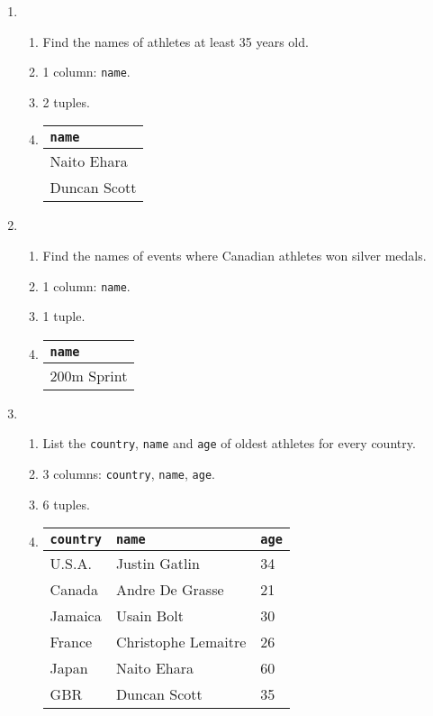 \documentclass{article}
\begin{document}
\begin{enumerate}
    \item
    \begin{enumerate}
        \item Find the names of athletes at least 35 years old.
        \item 1 column: \texttt{name}.
        \item 2 tuples.
        \item 
        \begin{tabular}{@{}l@{}}
            \toprule
            \texttt{name} \\ \midrule
            Naito Ehara   \\
            Duncan Scott  \\ \bottomrule
        \end{tabular}
    \end{enumerate}

    \item
    \begin{enumerate}
        \item Find the names of events where Canadian athletes won silver medals.
        \item 1 column: \texttt{name}.
        \item 1 tuple.
        \item
        \begin{tabular}{@{}l@{}}
            \toprule
            \texttt{name} \\ \midrule
            200m Sprint   \\ \bottomrule
        \end{tabular}
    \end{enumerate}

    \item
    \begin{enumerate}
        \item List the \texttt{country}, \texttt{name} and \texttt{age} of oldest athletes for every country.
        \item 3 columns: \texttt{country}, \texttt{name}, \texttt{age}.
        \item 6 tuples.
        \item
        \begin{tabular}{@{}lll@{}}
            \toprule
            \texttt{country} & \texttt{name}       & \texttt{age} \\ \midrule
            U.S.A.           & Justin Gatlin       & 34           \\
            Canada           & Andre De Grasse     & 21           \\
            Jamaica          & Usain Bolt          & 30           \\
            France           & Christophe Lemaitre & 26           \\
            Japan            & Naito Ehara         & 60           \\
            GBR              & Duncan Scott        & 35           \\ \bottomrule
        \end{tabular}
    \end{enumerate}
\end{enumerate}
\end{document}
